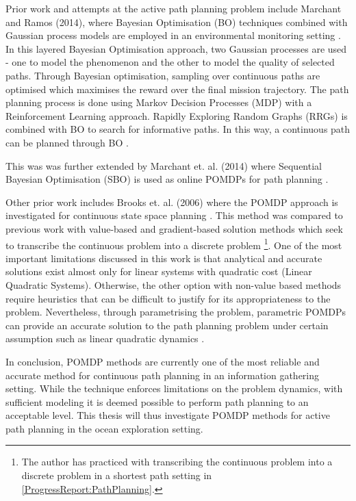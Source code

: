 		Prior work and attempts at the active path planning problem include Marchant and Ramos (2014), where Bayesian Optimisation (BO) techniques combined with Gaussian process models are employed in an environmental monitoring setting \cite{BayesianOptimisation}. In this layered Bayesian Optimisation approach, two Gaussian processes are used - one to model the phenomenon and the other to model the quality of selected paths. Through Bayesian optimisation, sampling over continuous paths are optimised which maximises the reward over the final mission trajectory. The path planning process is done using Markov Decision Processes (MDP) with a Reinforcement Learning approach. Rapidly Exploring Random Graphs (RRGs) is combined with BO to search for informative paths. In this way, a continuous path can be planned through BO \cite{BayesianOptimisation}.
		
		This was was further extended by Marchant et. al. (2014) where Sequential Bayesian Optimisation (SBO) is used as online POMDPs for path planning \cite{SequentialBayesianOptimisation}.
		
		Other prior work includes Brooks et. al. (2006) where the POMDP approach is investigated for continuous state space planning \cite{ParametricPOMDP}. This method was compared to previous work with value-based and gradient-based solution methods which seek to transcribe the continuous problem into a discrete problem \footnote{{\color{BurntOrange} The author has practiced with transcribing the continuous problem into a discrete problem in a shortest path setting in \cref{ProgressReport:PathPlanning}.}}. One of the most important limitations discussed in this work is that analytical and accurate solutions exist almost only for linear systems with quadratic cost (Linear Quadratic Systems). Otherwise, the other option with non-value based methods require heuristics that can be difficult to justify for its appropriateness to the problem. Nevertheless, through parametrising the problem, parametric POMDPs can provide an accurate solution to the path planning problem under certain assumption such as linear quadratic dynamics \cite{ParametricPOMDP}.
		
		In conclusion, POMDP methods are currently one of the most reliable and accurate method for continuous path planning in an information gathering setting. While the technique enforces limitations on the problem dynamics, with sufficient modeling it is deemed possible to perform path planning to an acceptable level. This thesis will thus investigate POMDP methods for active path planning in the ocean exploration setting.

